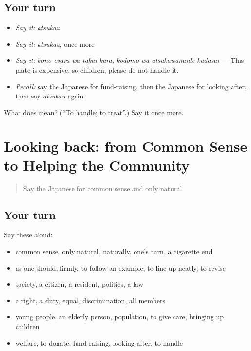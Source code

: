 \subsection*{Your turn}
\begin{itemize}
\raggedright
  \item \emph{Say it:} \emph{atsukau}
  \item \emph{Say it:} \emph{atsukau}, once more
  \item \emph{Say it:} \emph{kono osara wa takai kara, kodomo wa atsukawanaide kudasai} — This plate is expensive, so children, please do not handle it.
  \item \emph{Recall:} say the Japanese for fund-raising, then the Japanese for looking after, then say \emph{atsukau} again
\end{itemize}

\begin{tcolorbox}[breakable,colback=teal!4,colframe=teal!35!black,title={Before you move on}]
What does  mean? (\textquotedblleft{}To handle; to treat\textquotedblright{}.) Say it once more.
\end{tcolorbox}
\section[(dialogue)]{Looking back: from Common Sense to Helping the Community}

\label{lesson:JA-R334-review-329-334}



\begin{quote}
Say the Japanese for common sense and only natural.
\end{quote}

\subsection*{Your turn}
Say these aloud:

\begin{itemize}
\raggedright
  \item common sense, only natural, naturally, one's turn, a cigarette end
  \item as one should, firmly, to follow an example, to line up neatly, to revise
  \item society, a citizen, a resident, politics, a law
  \item a right, a duty, equal, discrimination, all members
  \item young people, an elderly person, population, to give care, bringing up children
  \item welfare, to donate, fund-raising, looking after, to handle
\end{itemize}

